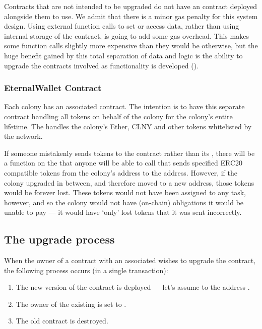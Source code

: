 Contracts that are not intended to be upgraded do not have an  contract deployed alongside them to use. We admit that there is a minor gas penalty for this system design. Using external function calls to set or access data, rather than using internal storage of the contract, is going to add some gas overhead. This makes some function calls slightly more expensive than they would be otherwise, but the huge benefit gained by this total separation of data and logic is the ability to upgrade the contracts involved as functionality is developed (\cite{UpgradingContracts}). 

\subsubsection{EternalWallet Contract}
Each colony has an associated  contract. The intention is to have this separate contract handling all tokens on behalf of the colony for the colony's entire lifetime. The  handles the colony's Ether, CLNY and other tokens whitelisted by the network. 

If someone mistakenly sends tokens to the  contract rather than its , there will be a function on the  that anyone will be able to call that sends specified ERC20 compatible tokens from the colony's address to the  address. However, if the colony upgraded in between, and therefore moved to a new address, those tokens would be forever lost. These tokens would not have been assigned to any task, however, and so the colony would not have (on-chain) obligations it would be unable to pay --- it would have `only' lost tokens that it was sent incorrectly.

\subsection{The upgrade process}

When the owner of a contract with an associated  wishes to upgrade the contract, the following process occurs (in a single transaction):

\begin{enumerate}
\item The new version of the contract is deployed --- let's assume to the address .
\item The owner of the existing  is set to .
\item The old contract is destroyed.
\end{enumerate}

